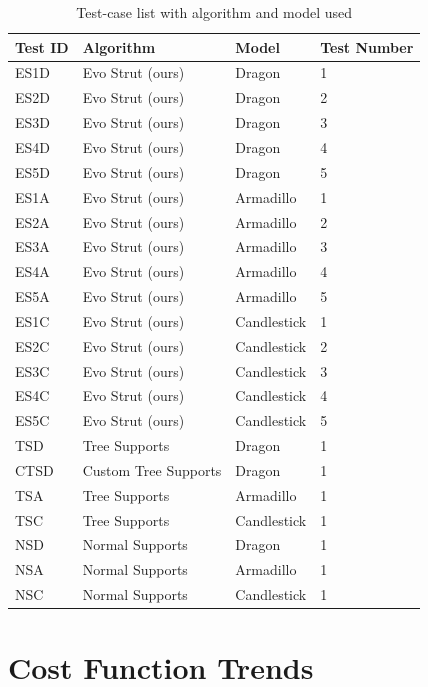\begin{table}[htbp]
  \centering
  \caption{Test-case list with algorithm and model used}
  \label{tab:algorithm_naming}
  \hspace{4pt}
  \begin{tabular}{llll}
    \toprule
    Test ID & Algorithm & Model & Test Number \\
    \midrule
    ES1D & Evo Strut (ours) & Dragon & 1\\
    ES2D & Evo Strut (ours) & Dragon & 2\\
    ES3D & Evo Strut (ours) & Dragon & 3\\
    ES4D & Evo Strut (ours) & Dragon & 4\\
    ES5D & Evo Strut (ours) & Dragon & 5\\
    \addlinespace
    ES1A & Evo Strut (ours) & Armadillo & 1\\
    ES2A & Evo Strut (ours) & Armadillo & 2\\
    ES3A & Evo Strut (ours) & Armadillo & 3\\
    ES4A & Evo Strut (ours) & Armadillo & 4\\
    ES5A & Evo Strut (ours) & Armadillo & 5\\
    \addlinespace
    ES1C & Evo Strut (ours) & Candlestick & 1\\
    ES2C & Evo Strut (ours) & Candlestick & 2\\
    ES3C & Evo Strut (ours) & Candlestick & 3\\
    ES4C & Evo Strut (ours) & Candlestick & 4\\
    ES5C & Evo Strut (ours) & Candlestick & 5\\
    \midrule
    TSD & Tree Supports & Dragon & 1\\
    CTSD & Custom Tree Supports & Dragon & 1\\
    TSA & Tree Supports & Armadillo & 1\\
    TSC & Tree Supports & Candlestick & 1\\
    \midrule
    NSD & Normal Supports & Dragon & 1\\
    NSA & Normal Supports & Armadillo & 1\\
    NSC & Normal Supports & Candlestick & 1\\
    \bottomrule
  \end{tabular}
\end{table}


\section{Cost Function Trends}

